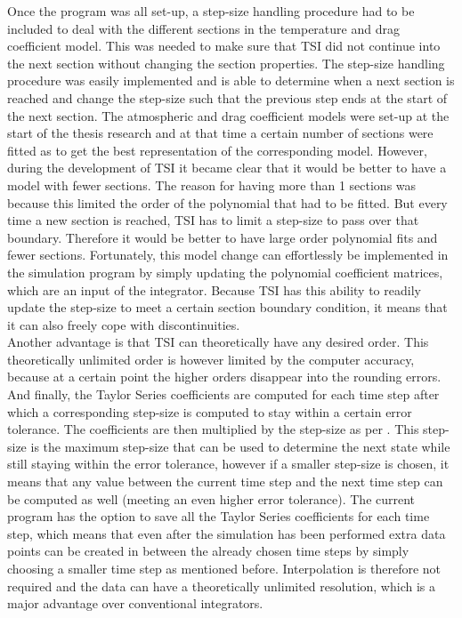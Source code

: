 \noindent
Once the program was all set-up, a step-size handling procedure had to be included to deal with the different sections in the temperature and drag coefficient model. This was needed to make sure that \ac{TSI} did not continue into the next section without changing the section properties. The step-size handling procedure was easily implemented and is able to determine when a next section is reached and change the step-size such that the previous step ends at the start of the next section. The atmospheric and drag coefficient models were set-up at the start of the thesis research and at that time a certain number of sections were fitted as to get the best representation of the corresponding model. However, during the development of \ac{TSI} it became clear that it would be better to have a model with fewer sections. The reason for having more than 1 sections was because this limited the order of the polynomial that had to be fitted. But every time a new section is reached, \ac{TSI} has to limit a step-size to pass over that boundary. Therefore it would be better to have large order polynomial fits and fewer sections. Fortunately, this model change can effortlessly be implemented in the simulation program by simply updating the polynomial coefficient matrices, which are an input of the integrator. 
Because \ac{TSI} has this ability to readily update the step-size to meet a certain section boundary condition, it means that it can also freely cope with discontinuities.  \\
Another advantage is that \ac{TSI} can theoretically have any desired order. This theoretically unlimited order is however limited by the computer accuracy, because at a certain point the higher orders disappear into the rounding errors.\\
And finally, the Taylor Series coefficients are computed for each time step after which a corresponding step-size is computed to stay within a certain error tolerance. The coefficients are then multiplied by the step-size as per . This step-size is the maximum step-size that can be used to determine the next state while still staying within the error tolerance, however if a smaller step-size is chosen, it means that any value between the current time step and the next time step can be computed as well (meeting an even higher error tolerance). The current program has the option to save all the Taylor Series coefficients for each time step, which means that even after the simulation has been performed extra data points can be created in between the already chosen time steps by simply choosing a smaller time step as mentioned before. Interpolation is therefore not required and the data can have a theoretically unlimited resolution, which is a major advantage over conventional integrators.



